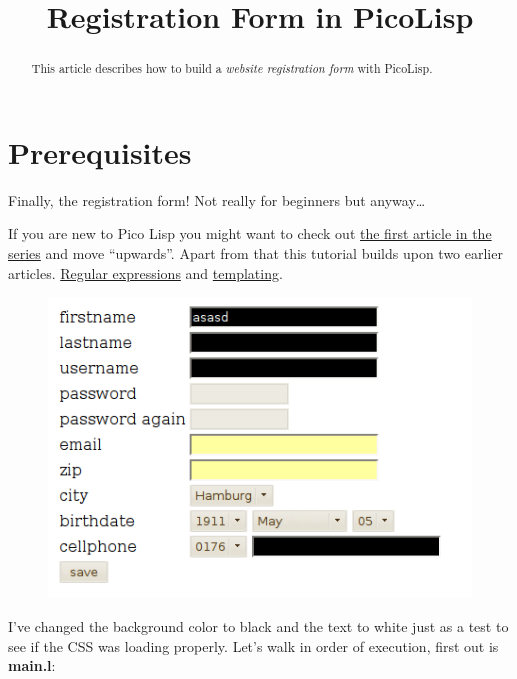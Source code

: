 \title{Registration Form in PicoLisp}

\maketitle

\begin{abstract}
  This article describes how to build a \emph{website registration
    form} with PicoLisp.   
\end{abstract}

\section{Prerequisites}
\label{sec:registration-form}

Finally, the registration form! Not really for beginners but anyway…

If you are new to Pico Lisp you might want to check out
\href{http://www.prodevtips.com/2008/03/28/pico-lisp/}{the first article in the series} and move ``upwards''. Apart from that this tutorial builds
upon two earlier articles.
\href{http://www.prodevtips.com/2008/07/01/regular-expressions-in-pico-lisp/}{Regular expressions} and
\href{http://www.prodevtips.com/2008/07/17/templating-in-pico-lisp/}{templating}.

\begin{figure}[H]
  \centering
\includegraphics[scale=.6]{graphics/pico_reg_form.png}  
\end{figure}

I've changed the background color to black and the text to white just as
a test to see if the CSS was loading properly. Let's walk in order of
execution, first out is \textbf{main.l}:

